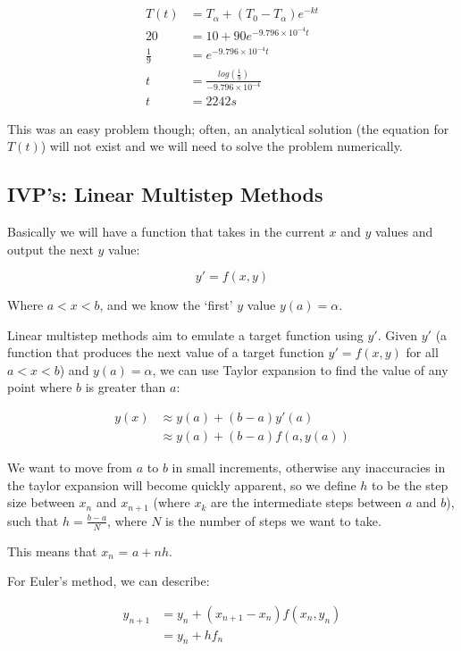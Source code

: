 \[
\begin{split}
  T(t) &= T_\alpha + (T_0 - T_\alpha)e^{-kt}\\
  20 &= 10 + 90e^{-9.796\times10^{-4}t}\\
  \frac{1}{9} &= e^{-9.796\times10^{-4}t}\\
  t &= \frac{log(\frac{1}{9})}{-9.796\times10^{-4}}\\
  t &= 2242s
\end{split}
\]

This was an easy problem though; often, an analytical solution (the
equation for $T(t)$) will not exist and we will need to solve the
problem numerically.

\subsection{IVP's: Linear Multistep Methods}

Basically we will have a function that takes in the current $x$ and
$y$ values and output the next $y$ value:

\[
  y' = f(x,y)
\]

Where $a < x < b$, and we know the `first' $y$ value $y(a) = \alpha$.

Linear multistep methods aim to emulate a target function using
$y'$. Given $y'$ (a function that produces the next value of a target
function $y' = f(x,y)$ for all $a < x < b$) and $y(a) = \alpha$, we
can use Taylor expansion to find the value of any point where $b$ is
greater than $a$:


\[
\begin{split}
  y(x) &\approx y(a) + (b - a)y'(a)\\
       &\approx y(a) + (b - a)f(a, y(a))
\end{split}
\]

We want to move from $a$ to $b$ in small increments, otherwise any
inaccuracies in the taylor expansion will become quickly apparent, so
we define $h$ to be the step size between $x_n$ and $x_{n+1}$ (where
$x_k$ are the intermediate steps between $a$ and $b$), such that $h
= \frac{b - a}{N}$, where $N$ is the number of steps we want to take.

This means that $x_n$ = $a + nh$.

For Euler's method, we can describe:

\[
\begin{split}
  y_{n+1} &= y_n + (x_{n+1} - x_n)f(x_n, y_n)\\
          &= y_n + hf_n
\end{split}
\]

